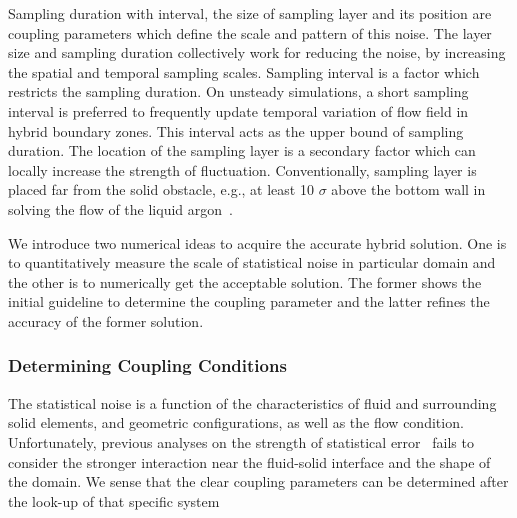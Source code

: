 \documentclass[preprint,12pt]{elsarticle}
\begin{document}


Sampling duration with interval, the size of sampling layer and its position are coupling parameters which define the scale and pattern of this noise. The layer size and sampling duration collectively work for reducing the noise, by increasing the spatial and temporal sampling scales. Sampling interval is a factor which restricts the sampling duration. On unsteady simulations, a short sampling interval is preferred to frequently update temporal variation of flow field in hybrid boundary zones. This interval acts as the upper bound of sampling duration. The location of the sampling layer is a secondary factor which can locally increase the strength of fluctuation. Conventionally, sampling layer is placed far from the solid obstacle, e.g., at least 10 $\sigma$ above the bottom wall in solving the flow of the liquid argon~\cite{Yen}.

We introduce two numerical ideas to acquire the accurate hybrid solution. One is to quantitatively measure the scale of statistical noise in particular domain and the other is to numerically get the acceptable solution. The former shows the initial guideline to determine the coupling parameter and the latter refines the accuracy of the former solution.


\subsubsection{Determining Coupling Conditions}
\label{sec:numerical_parameters}
The statistical noise is a function of the characteristics of fluid and surrounding solid elements, and geometric configurations, as well as the flow condition. 
Unfortunately, previous analyses on the strength of statistical error~\cite{Hadjicon3,Time_Mechanism} fails to consider the stronger interaction near the fluid-solid interface and the shape of the domain. We sense that the clear coupling parameters can be determined after the look-up of that specific system 
\end{document}
